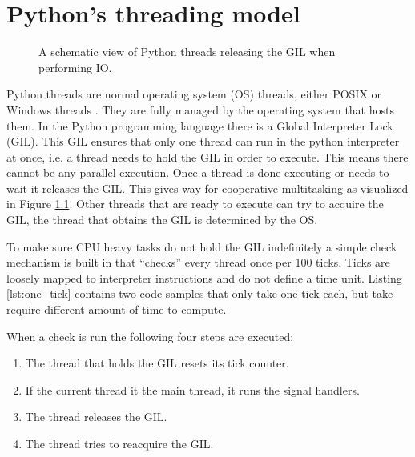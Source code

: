 \chapter{Python's threading model}

\begin{figure}[t!]
	\caption{A schematic view of Python threads releasing the GIL when performing IO.}
	\label{fig:python_threads_release_gil}
\end{figure}

Python threads are normal operating system (OS) threads, either POSIX or Windows threads \cite{beazley2010understanding, beazley2009inside}.
They are fully managed by the operating system that hosts them.
In the Python programming language there is a Global Interpreter Lock (GIL).
This GIL ensures that only one thread can run in the python interpreter at once, i.e. a thread needs to hold the GIL in order to execute.
This means there cannot be any parallel execution.
Once a thread is done executing or needs to wait it releases the GIL.
This gives way for cooperative multitasking as visualized in Figure \ref{fig:python_threads_release_gil}.
Other threads that are ready to execute can try to acquire the GIL, the thread that obtains the GIL is determined by the OS.

To make sure CPU heavy tasks do not hold the GIL indefinitely a simple check mechanism is built in that ``checks'' every thread once per 100 ticks.
Ticks are loosely mapped to interpreter instructions and do not define a time unit.
Listing \ref{lst:one_tick} contains two code samples that only take one tick each, but take require different amount of time to compute.



When a check is run the following four steps are executed:
\begin{enumerate}
	\item The thread that holds the GIL resets its tick counter.
	\item If the current thread it the main thread, it runs the signal handlers.
	\item The thread releases the GIL.
	\item The thread tries to reacquire the GIL.
\end{enumerate}


